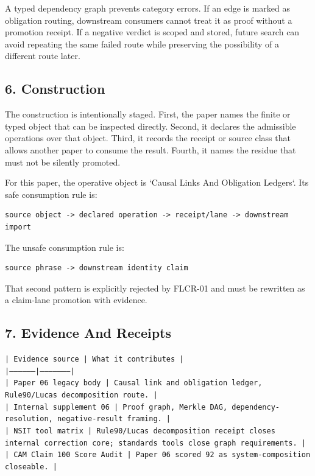 \documentclass[11pt]{article}
\begin{document}
A typed dependency graph prevents category errors. If an edge is marked as obligation routing, downstream consumers cannot treat it as proof without a promotion receipt. If a negative verdict is scoped and stored, future search can avoid repeating the same failed route while preserving the possibility of a different route later.

\subsection*{6. Construction}

The construction is intentionally staged. First, the paper names the finite or
typed object that can be inspected directly. Second, it declares the admissible
operations over that object. Third, it records the receipt or source class that
allows another paper to consume the result. Fourth, it names the residue that
must not be silently promoted.

For this paper, the operative object is `Causal Links And Obligation Ledgers`. Its safe consumption
rule is:

\begin{verbatim}
source object -> declared operation -> receipt/lane -> downstream import
\end{verbatim}

The unsafe consumption rule is:

\begin{verbatim}
source phrase -> downstream identity claim
\end{verbatim}

That second pattern is explicitly rejected by FLCR-01 and must be rewritten as
a claim-lane promotion with evidence.

\subsection*{7. Evidence And Receipts}

\noindent\texttt{| Evidence source | What it contributes |}\\
\noindent\texttt{|-----------------|---------------------|}\\
\noindent\texttt{| Paper 06 legacy body | Causal link and obligation ledger, Rule90/Lucas decomposition route. |}\\
\noindent\texttt{| Internal supplement 06 | Proof graph, Merkle DAG, dependency-resolution, negative-result framing. |}\\
\noindent\texttt{| NSIT tool matrix | Rule90/Lucas decomposition receipt closes internal correction core; standards tools close graph requirements. |}\\
\noindent\texttt{| CAM Claim 100 Score Audit | Paper 06 scored 92 as system-composition closeable. |}\\
\end{document}
